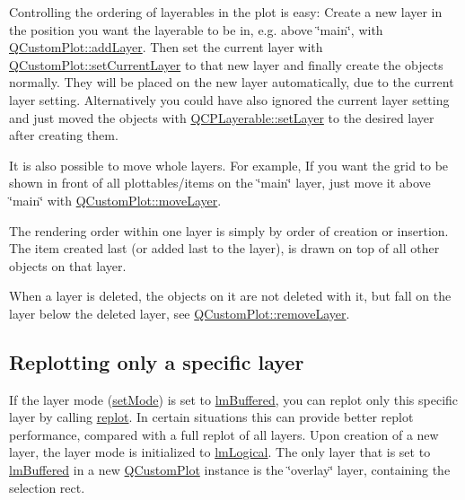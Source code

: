 Controlling the ordering of layerables in the plot is easy\+: Create a new layer in the position you want the layerable to be in, e.\+g. above \char`\"{}main\char`\"{}, with \mbox{\hyperlink{class_q_custom_plot_ad5255393df078448bb6ac83fa5db5f52}{Q\+Custom\+Plot\+::add\+Layer}}. Then set the current layer with \mbox{\hyperlink{class_q_custom_plot_a73a6dc47c653bb6f8f030abca5a11852}{Q\+Custom\+Plot\+::set\+Current\+Layer}} to that new layer and finally create the objects normally. They will be placed on the new layer automatically, due to the current layer setting. Alternatively you could have also ignored the current layer setting and just moved the objects with \mbox{\hyperlink{class_q_c_p_layerable_ab0d0da6d2de45a118886d2c8e16d5a54}{Q\+C\+P\+Layerable\+::set\+Layer}} to the desired layer after creating them.

It is also possible to move whole layers. For example, If you want the grid to be shown in front of all plottables/items on the \char`\"{}main\char`\"{} layer, just move it above \char`\"{}main\char`\"{} with \mbox{\hyperlink{class_q_custom_plot_ae896140beff19424e9e9e02d6e331104}{Q\+Custom\+Plot\+::move\+Layer}}.

The rendering order within one layer is simply by order of creation or insertion. The item created last (or added last to the layer), is drawn on top of all other objects on that layer.

When a layer is deleted, the objects on it are not deleted with it, but fall on the layer below the deleted layer, see \mbox{\hyperlink{class_q_custom_plot_a40f75e342c5eaab6a86066a42a0e2a94}{Q\+Custom\+Plot\+::remove\+Layer}}.\hypertarget{class_q_c_p_layer_qcplayer-buffering}{}\subsection{Replotting only a specific layer}\label{class_q_c_p_layer_qcplayer-buffering}
If the layer mode (\mbox{\hyperlink{class_q_c_p_layer_a938d57b04f4e4c23cedf1711f983919b}{set\+Mode}}) is set to \mbox{\hyperlink{class_q_c_p_layer_a67dcfc1590be2a1f2227c5a39bb59c7cab581b9fab3007c4c65f057f4185d7538}{lm\+Buffered}}, you can replot only this specific layer by calling \mbox{\hyperlink{class_q_c_p_layer_adefd53b6db02f470151c416f42e37180}{replot}}. In certain situations this can provide better replot performance, compared with a full replot of all layers. Upon creation of a new layer, the layer mode is initialized to \mbox{\hyperlink{class_q_c_p_layer_a67dcfc1590be2a1f2227c5a39bb59c7ca02eb5e9a4cb7f1baf1e2b6b99e3b87ce}{lm\+Logical}}. The only layer that is set to \mbox{\hyperlink{class_q_c_p_layer_a67dcfc1590be2a1f2227c5a39bb59c7cab581b9fab3007c4c65f057f4185d7538}{lm\+Buffered}} in a new \mbox{\hyperlink{class_q_custom_plot}{Q\+Custom\+Plot}} instance is the \char`\"{}overlay\char`\"{} layer, containing the selection rect. 

